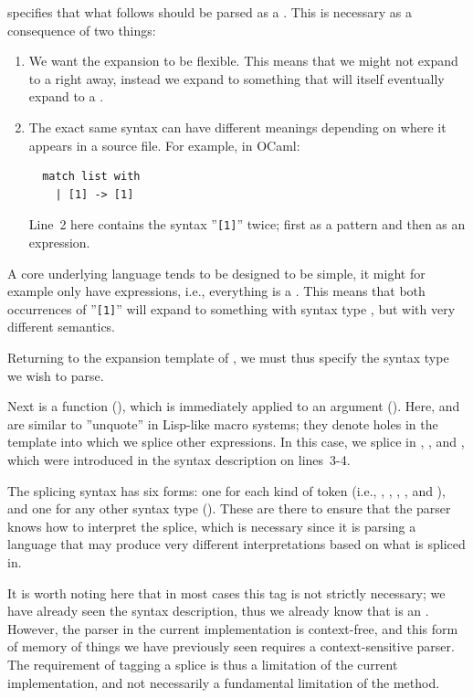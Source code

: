 \documentclass{kththesis}
\begin{document}
 specifies that what follows should be parsed as a . This is necessary as a consequence of two things:

\begin{enumerate}
  \item We want the expansion to be flexible. This means that we might not expand to a  right away, instead we expand to something that will itself eventually expand to a .
  \item The exact same syntax can have different meanings depending on where it appears in a source file. For example, in OCaml:

  \begin{verbatim}
  match list with
    | [1] -> [1]
  \end{verbatim}

  Line~2 here contains the syntax ''\texttt{[1]}'' twice; first as a pattern and then as an expression.
\end{enumerate}

A core underlying language tends to be designed to be simple, it might for example only have expressions, i.e., everything is a . This means that both occurrences of ''\texttt{[1]}'' will expand to something with syntax type , but with very different semantics.

Returning to the expansion template of , we must thus specify the syntax type we wish to parse.

Next is a function (), which is immediately applied to an argument (). Here,  and  are similar to ''unquote'' in Lisp-like macro systems; they denote holes in the template into which we splice other expressions. In this case, we splice in , , and , which were introduced in the syntax description on lines~3-4.

The splicing syntax has six forms: one for each kind of token (i.e., , , , , and ), and one for any other syntax type (). These are there to ensure that the parser knows how to interpret the splice, which is necessary since it is parsing a language that may produce very different interpretations based on what is spliced in.

It is worth noting here that in most cases this tag is not strictly necessary; we have already seen the syntax description, thus we already know that  is an . However, the parser in the current implementation is context-free, and this form of memory of things we have previously seen requires a context-sensitive parser. The requirement of tagging a splice is thus a limitation of the current implementation, and not necessarily a fundamental limitation of the method.
\end{document}
